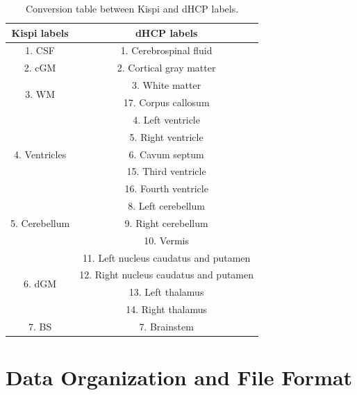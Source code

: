 \begin{table}[htbp]
    \centering
    \begin{tabular}{c|c}
        \toprule
        \textbf{Kispi labels} & \textbf{dHCP labels} \\
        \midrule
        1. CSF & 1. Cerebrospinal fluid \\ \hline
        2. cGM & 2. Cortical gray matter \\ \hline
        \multirow{2}{*}{3. WM} & 3. White matter \\
         & 17. Corpus callosum \\ \hline
        \multirow{5}{*}{4. Ventricles} & 4. Left ventricle \\
         & 5. Right ventricle \\
         & 6. Cavum septum \\
         & 15. Third ventricle \\
         & 16. Fourth ventricle \\ \hline
        \multirow{3}{*}{5. Cerebellum} & 8. Left cerebellum \\
         & 9. Right cerebellum \\
         & 10. Vermis \\ \hline
        \multirow{4}{*}{6. dGM} & 11. Left nucleus caudatus and putamen \\
         & 12. Right nucleus caudatus and putamen \\
         & 13. Left thalamus \\
         & 14. Right thalamus \\ \hline
        7. BS & 7. Brainstem \\
        \bottomrule
    \end{tabular}
    \caption{Conversion table between Kispi and dHCP labels.}
    \label{tab:label_merge}
\end{table}

\section{Data Organization and File Format}

